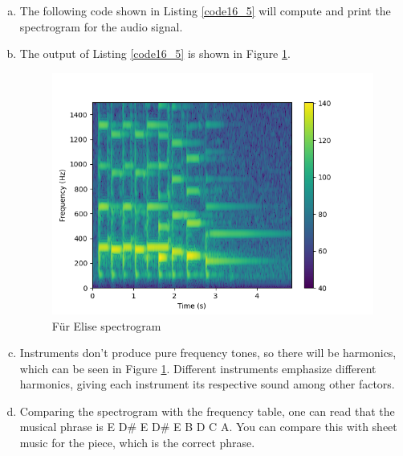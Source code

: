 \begin{enumerate}
\begin{enumerate}[a)]
          \item The following code shown in Listing \ref{code16_5} will compute and print the spectrogram for the audio signal.

                

          \item The output of Listing \ref{code16_5} is shown in Figure \ref{fur_elise_spectogram}.
                \begin{figure}[h!]
                  \centering
                  \includegraphics[scale=1.0]{ch16/figures/fur_elise_spectogram.png}
                  \caption{Für Elise spectrogram}
                  \label{fur_elise_spectogram}
                \end{figure}

          \item Instruments don't produce pure frequency tones, so there will be harmonics, which can
                be seen in Figure \ref{fur_elise_spectogram}. Different instruments emphasize different harmonics,
                giving each instrument its respective sound among other factors.

          \item Comparing the spectrogram with the frequency table, one can read that the musical phrase is E D\# E D\# E B D C A.
                You can compare this with sheet music for the piece, which is the correct phrase.

        \end{enumerate}
\end{enumerate}